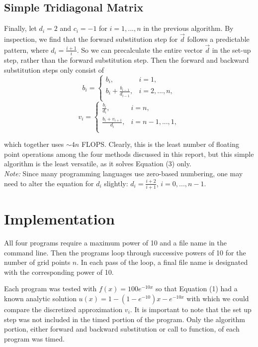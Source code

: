 \documentclass[prb,aps,twocolumn,showpacs,10pt]{revtex4-1}
\begin{document}
\subsection{Simple Tridiagonal Matrix}

Finally, let $d_i=2$ and $c_i=-1$ for $i = 1, ...,n$ in the previous algorithm. By inspection, we find that the forward substitution step for $\vec{d}$ follows a predictable pattern, where $d_i = \frac{i+1}{i}$. So we can precalculate the entire vector $\vec{d}$ in the set-up step, rather than the forward substitution step. Then the forward and backward substitution steps only consist of
\begin{equation}
b_i = \begin{cases} 
      b_i, &i=1,\\
      b_i+\frac{b_{i-1}}{d_{i-1}}, &i=2,...,n,\\
   \end{cases}
\end{equation}
\begin{equation}
v_i = \begin{cases} 
      \frac{b_i}{d_i}, &i=n,\\
      \frac{b_i+v_{i+1}}{d_i}, &i=n-1,...,1,\\
   \end{cases}
\end{equation}

\noindent which together uses $\sim 4 n$ FLOPS. Clearly, this is the least number of floating point operations among the four methods discussed in this report, but this simple algorithm is the least versatile, as it solves Equation (3) only. \\

\textit{Note:} Since many programming languages use zero-based numbering, one may need to alter the equation for $d_i$ slightly: $d_i = \frac{i+2}{i+1}$, $i=0,...,n-1$. 

\section{Implementation}

All four programs require a maximum power of 10 and a file name in the command line. Then the programs loop through successive powers of 10 for the number of grid points $n$. In each pass of the loop, a final file name is designated with the corresponding power of 10. 

Each program was tested with $f(x)=100e^{-10x}$ so that Equation (1) had a known analytic solution $u(x)= 1-(1-e^{-10})x-e^{-10x}$ with which we could compare the discretized approximation $v_i$. It is important to note that the set up step was not included in the timed portion of the program. Only the algorithm portion, either forward and backward substitution or call to function, of each program was timed.\\
\end{document}
